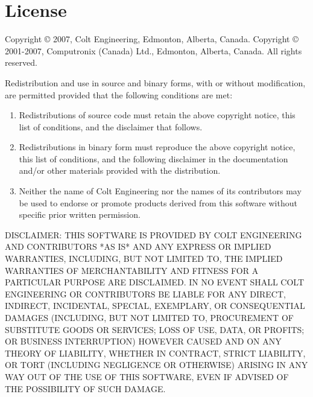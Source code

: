 \chapter{License}

\centerline{}

Copyright \copyright{} 2007, Colt Engineering, Edmonton, Alberta, Canada.
Copyright \copyright{} 2001-2007, Computronix (Canada) Ltd., Edmonton, Alberta, Canada.
All rights reserved.

Redistribution and use in source and binary forms, with or without
modification, are permitted provided that the following conditions are met:

\begin{enumerate}
\item
    Redistributions of source code must retain the above copyright notice,
    this list of conditions, and the disclaimer that follows.

\item
    Redistributions in binary form must reproduce the above copyright
    notice, this list of conditions, and the following disclaimer in the
    documentation and/or other materials provided with the distribution.

\item
    Neither the name of Colt Engineering nor the names of its contributors may
    be used to endorse or promote products derived from this software
    without specific prior written permission.
\end{enumerate}

DISCLAIMER:
THIS SOFTWARE IS PROVIDED BY COLT ENGINEERING AND CONTRIBUTORS *AS IS*
AND ANY EXPRESS OR IMPLIED WARRANTIES, INCLUDING, BUT NOT LIMITED TO,
THE IMPLIED WARRANTIES OF MERCHANTABILITY AND FITNESS FOR A
PARTICULAR PURPOSE ARE DISCLAIMED. IN NO EVENT SHALL COLT ENGINEERING
OR CONTRIBUTORS BE LIABLE FOR ANY DIRECT, INDIRECT, INCIDENTAL,
SPECIAL, EXEMPLARY, OR CONSEQUENTIAL DAMAGES (INCLUDING, BUT NOT
LIMITED TO, PROCUREMENT OF SUBSTITUTE GOODS OR SERVICES; LOSS OF
USE, DATA, OR PROFITS; OR BUSINESS INTERRUPTION) HOWEVER CAUSED
AND ON ANY THEORY OF LIABILITY, WHETHER IN CONTRACT, STRICT LIABILITY,
OR TORT (INCLUDING NEGLIGENCE OR OTHERWISE) ARISING IN ANY WAY OUT
OF THE USE OF THIS SOFTWARE, EVEN IF ADVISED OF THE POSSIBILITY OF
SUCH DAMAGE.

